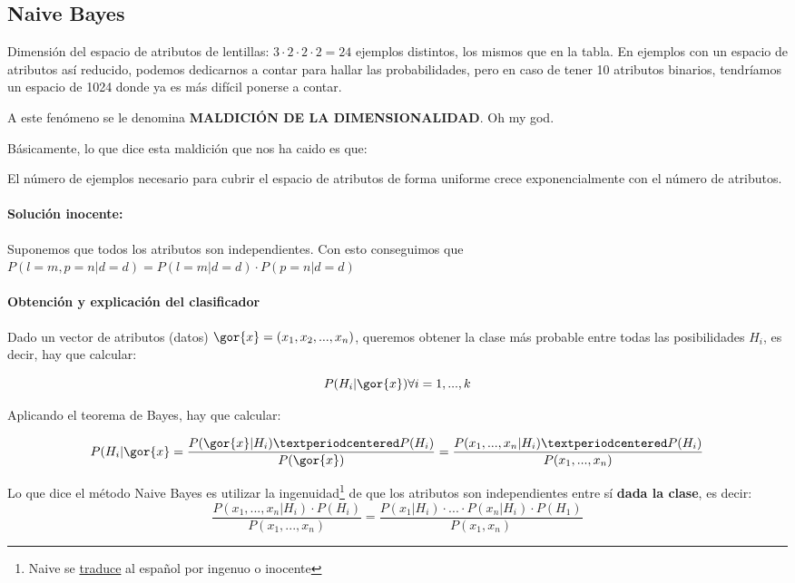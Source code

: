 \documentclass{apuntes}
\begin{document}
\subsection{Naive Bayes}

Dimensión del espacio de atributos de lentillas: $3·2·2·2 = 24$ ejemplos distintos, los mismos que en la tabla. En ejemplos con un espacio de atributos así reducido, podemos dedicarnos a contar para hallar las probabilidades, pero en caso de tener 10 atributos binarios, tendríamos un espacio de 1024 donde ya es más difícil ponerse a contar.

A este fenómeno se le denomina \textbf{MALDICIÓN DE LA DIMENSIONALIDAD}. Oh my god.

\begin{defn}
Básicamente, lo que dice esta maldición que nos ha caido es que:

El número de ejemplos necesario para cubrir el espacio de atributos de forma uniforme crece exponencialmente con el número de atributos.
\end{defn}

\paragraph{Solución inocente: } Suponemos que todos los atributos son independientes. Con esto conseguimos que $P(l=m,p=n | d=d) = P(l=m | d=d)·P(p=n | d=d)$ 

\paragraph{Obtención y explicación del clasificador}


Dado un vector de atributos (datos) $\gor{x} = (x_1,x_2,...,x_n)$, queremos obtener la clase más probable entre todas las posibilidades $H_i$, es decir, hay que calcular:

\[
P(H_i | \gor{x}) \forall i=1,...,k
\]

Aplicando el teorema de Bayes, hay que calcular:

\[
P(H_i|\gor{x} = \frac{P(\gor{x}|H_i)·P(H_i)}{P(\gor{x})} = \frac{P(x_1,...,x_n | H_i) · P(H_i)}{P(x_1,...,x_n)}
\]


Lo que dice el método Naive Bayes es utilizar la ingenuidad\footnote{Naive se \href{http://www.wordreference.com/es/translation.asp?tranword=Naive}{traduce} al español por ingenuo o inocente}  de que los atributos son independientes entre sí \textbf{dada la clase}, es decir: \[\frac{P(x_1,...,x_n | H_i) · P(H_i)}{P(x_1,...,x_n)} = \frac{P(x_1|H_i)·...·P(x_n|H_i) · P(H_1)}{P(x_1,x_n)}\]
\end{document}
